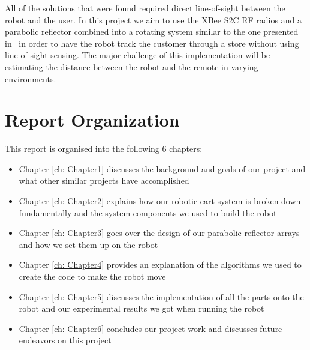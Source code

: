 \vspace*{12pt}
\noindent
All of the solutions that were found required direct line-of-sight between the robot and the user. In this project we aim to use the XBee S2C RF radios and a parabolic reflector combined into a rotating system similar to the one presented in~\cite{Miah2018-Intelligent} in order to have the robot track the customer through a store without using line-of-sight sensing. The major challenge of this implementation will be estimating the distance between the robot and the remote in varying environments.



\section{Report Organization}
This report is organised into the following 6 chapters:

\begin{itemize}
	\item Chapter \ref{ch: Chapter1} discusses the background and goals of our project and what other similar projects have accomplished
	\item Chapter \ref{ch: Chapter2} explains how our robotic cart system is broken down fundamentally and the system components we used to build the robot
	\item Chapter \ref{ch: Chapter3} goes over the design of our parabolic reflector arrays and how we set them up on the robot
	\item Chapter \ref{ch: Chapter4} provides an explanation of the algorithms we used to create the code to make the robot move
	\item Chapter \ref{ch: Chapter5} discusses the implementation of all the parts onto the robot and our experimental results we got when running the robot
	\item Chapter \ref{ch: Chapter6} concludes our project work and discusses future endeavors on this project
\end{itemize}


